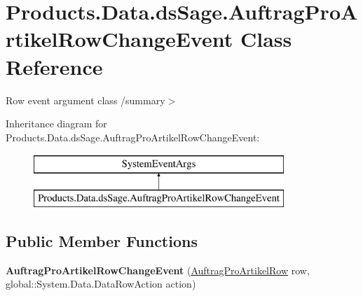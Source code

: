 \hypertarget{class_products_1_1_data_1_1ds_sage_1_1_auftrag_pro_artikel_row_change_event}{}\section{Products.\+Data.\+ds\+Sage.\+Auftrag\+Pro\+Artikel\+Row\+Change\+Event Class Reference}
\label{class_products_1_1_data_1_1ds_sage_1_1_auftrag_pro_artikel_row_change_event}


Row event argument class /summary$>$  


Inheritance diagram for Products.\+Data.\+ds\+Sage.\+Auftrag\+Pro\+Artikel\+Row\+Change\+Event\+:\begin{figure}[H]
\begin{center}
\leavevmode
\includegraphics[height=2.000000cm]{class_products_1_1_data_1_1ds_sage_1_1_auftrag_pro_artikel_row_change_event}
\end{center}
\end{figure}
\subsection*{Public Member Functions}
\begin{DoxyCompactItemize}
\item 
{\bfseries Auftrag\+Pro\+Artikel\+Row\+Change\+Event} (\hyperlink{class_products_1_1_data_1_1ds_sage_1_1_auftrag_pro_artikel_row}{Auftrag\+Pro\+Artikel\+Row} row, global\+::\+System.\+Data.\+Data\+Row\+Action action)\hypertarget{class_products_1_1_data_1_1ds_sage_1_1_auftrag_pro_artikel_row_change_event_a4e9672d92eaab25d470b2a212dc2e047}{}\label{class_products_1_1_data_1_1ds_sage_1_1_auftrag_pro_artikel_row_change_event_a4e9672d92eaab25d470b2a212dc2e047}

\end{DoxyCompactItemize}
